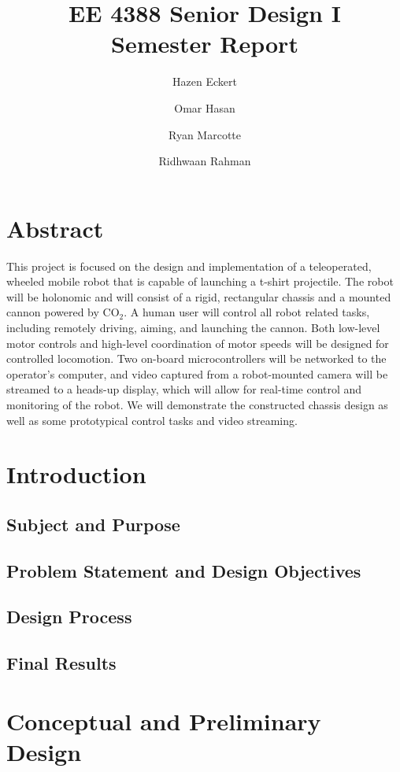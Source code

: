 \documentclass[letterpaper,12pt]{article}
\begin{document}
\title{EE 4388 Senior Design I\\Semester Report}
\author{Hazen Eckert \and Omar Hasan \and Ryan Marcotte \and Ridhwaan Rahman}
\maketitle
\tableofcontents

\section{Abstract}
\noindent This project is focused on the design and implementation of a teleoperated, wheeled mobile robot that is capable of launching a t-shirt projectile. The robot will be holonomic and will consist of a rigid, rectangular chassis and a mounted cannon powered by $\textrm{CO}_2$. A human user will control all robot related tasks, including remotely driving, aiming, and launching the cannon. Both low-level motor controls and high-level coordination of motor speeds will be designed for controlled locomotion. Two on-board microcontrollers will be networked to the operator's computer, and video captured from a robot-mounted camera will be streamed to a heads-up display, which will allow for real-time control and monitoring of the robot. We will demonstrate the constructed chassis design as well as some prototypical control tasks and video streaming.

\section{Introduction}
\subsection{Subject and Purpose}
\subsection{Problem Statement and Design Objectives}
\subsection{Design Process}
\subsection{Final Results}

\section{Conceptual and Preliminary Design}
\end{document}
